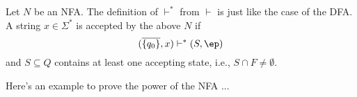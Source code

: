 \newpage
\begin{defn}
  Let $N$ be an NFA.
  The definition of $\vdash^*$ from $\vdash$ is just like the case of the
  DFA.
  A string $x \in \Sigma^*$ is accepted by the above $N$ if
  \[
  (\overline{\{q_0\}}, x) \vdash^* (S, \ep)
  \]
  and $S \subseteq Q$ contains at least one accepting state, i.e.,
  $S \cap F \neq \emptyset$.
\end{defn}

Here's an example to prove the power of the NFA ...


